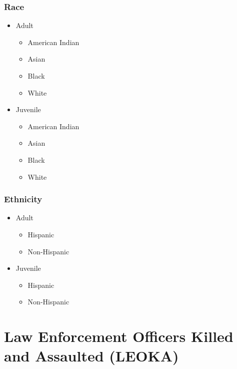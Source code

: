 \documentclass[
  12pt,
  openany]{book}
\providecommand{\tightlist}{%
  \setlength{\itemsep}{0pt}\setlength{\parskip}{0pt}}
\begin{document}
\hypertarget{race}{%
\subsection{Race}\label{race}}

\begin{itemize}
\tightlist
\item
  Adult

  \begin{itemize}
  \tightlist
  \item
    American Indian
  \item
    Asian
  \item
    Black
  \item
    White
  \end{itemize}
\item
  Juvenile

  \begin{itemize}
  \tightlist
  \item
    American Indian
  \item
    Asian
  \item
    Black
  \item
    White
  \end{itemize}
\end{itemize}

\hypertarget{ethnicity}{%
\subsection{Ethnicity}\label{ethnicity}}

\begin{itemize}
\tightlist
\item
  Adult

  \begin{itemize}
  \tightlist
  \item
    Hispanic
  \item
    Non-Hispanic
  \end{itemize}
\item
  Juvenile

  \begin{itemize}
  \tightlist
  \item
    Hispanic
  \item
    Non-Hispanic
  \end{itemize}
\end{itemize}

\hypertarget{leoka}{%
\chapter{Law Enforcement Officers Killed and Assaulted (LEOKA)}\label{leoka}}
\end{document}
